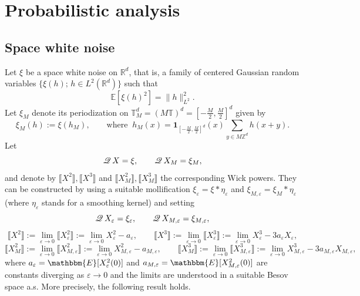 \documentclass[a4paper,11pt]{article}
\newcommand{\assign}{:=}
\numberwithin{equation}{section}
\newcommand{\Q}{\mathscr{Q} \hspace{.2em}}
\newcommand{\R}{\mathbb{R}}
\newcommand{\8}{\infty}
\begin{document}
\section{Probabilistic analysis}
\label{s:proba}

\subsection{Space white noise}
\label{ssec:renorm-el}

Let $\xi$ be a space white noise on $\R^{d}$, that is, a family of centered Gaussian random variables $\{\xi(h);\,h\in L^{2}(\R^{d}) \}$ such that
$$
\mathbb{E}[\xi(h)^{2}]=\|h\|^{2}_{L^{2}}.
$$
Let $\xi_{M}$ denote its periodization on $\mathbb{T}^{d}_{M}=(M\mathbb{T})^{d}=\left[-\frac{M}{2},\frac{M}{2}\right]^{d}$ given by
$$
\xi_{M}(h):=\xi(h_{M}),\qquad\text{where }\ h_{M}(x)=\mathbf{1}_{[-\frac{M}{2},\frac{M}{2}]^{d}}(x)\sum_{y\in M\mathbb{Z}^{d}}h(x+y).
$$
Let 
\begin{equation*}
 \Q X = \xi, \qquad  \Q X_{M} = \xi_{M},
\end{equation*}
and denote by $  \llbracket X^2 \rrbracket, \llbracket X^3 \rrbracket $ and $  \llbracket X_{M}^2 \rrbracket, \llbracket X_{M}^3 \rrbracket $ the corresponding Wick powers. They can be constructed by using a suitable mollification $\xi_{\varepsilon}=\xi*\eta_{\varepsilon}$ and $\xi_{M,\varepsilon}=\xi_{M}*\eta_{\varepsilon}$ (where $\eta_{\varepsilon}$ stands for a smoothing kernel) and setting
$$
 \Q X_{\varepsilon} = \xi_{\varepsilon}, \qquad  \Q X_{M,\varepsilon} = \xi_{M,\varepsilon},
$$
$$
 \llbracket X^2 \rrbracket  \assign \lim_{\varepsilon\to 0}  \llbracket X_{\varepsilon}^2 \rrbracket  \assign \lim_{\varepsilon\to 0}  X_{\varepsilon}^2 - a_{\varepsilon}, \qquad   \llbracket X^3 \rrbracket\assign\lim_{\varepsilon\to 0}  \llbracket X_{\varepsilon}^3 \rrbracket\assign \lim_{\varepsilon\to 0} X_{\varepsilon}^3 - 3 a_{\varepsilon} X_{\varepsilon},
 $$
 $$
 \llbracket X_{M}^2 \rrbracket  \assign \lim_{\varepsilon\to 0}  \llbracket X_{M,\varepsilon}^2 \rrbracket  \assign \lim_{\varepsilon\to 0}  X_{M,\varepsilon}^2 - a_{M,\varepsilon}, \qquad   \llbracket X_{M}^3 \rrbracket\assign\lim_{\varepsilon\to 0} \llbracket X_{M,\varepsilon}^3 \rrbracket\assign\lim_{\varepsilon\to 0} X_{M,\varepsilon}^3 - 3 a_{M,\varepsilon} X_{M,\varepsilon},
 $$
 where $a_{\varepsilon}= \mathbbm{E}[X_{\varepsilon}^2(0)]$  and $a_{M,\varepsilon}= \mathbbm{E}[X_{M,\varepsilon}^2(0)]$ are  constants diverging  as $\varepsilon\to0$ and the limits are understood in a suitable Besov space a.s. More precisely, the following result holds.
 
\end{document}
